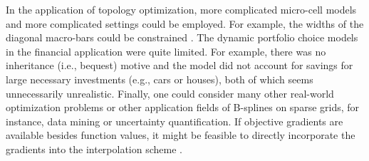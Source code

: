 In the application of topology optimization,
more complicated micro-cell models and more complicated
settings could be employed.
For example, the widths of the diagonal macro-bars could be constrained
\cite{Allaire16Towards}.
The dynamic portfolio choice models in the financial application
were quite limited.
For example, there was no inheritance (i.e., bequest) motive and
the model did not account for savings for large necessary investments
(e.g., cars or houses), both of which seems unnecessarily unrealistic.
Finally, one could consider many other real-world optimization problems
or other application fields of B-splines on sparse grids,
for instance, data mining or uncertainty quantification.
If objective gradients are available besides function values,
it might be feasible to directly incorporate the gradients into
the interpolation scheme \cite{Baar15Gradient}.


  
  
  
  
  
  
  
  
  
